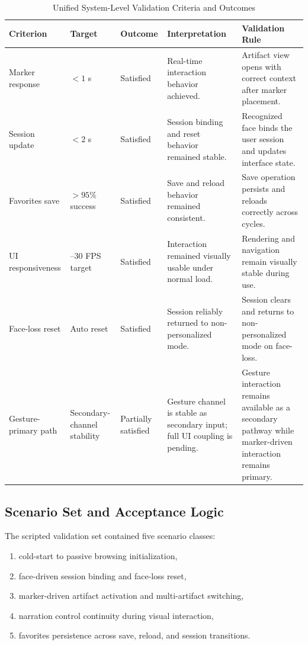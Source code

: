 \documentclass[conference]{IEEEtran}
\begin{document}
\begin{table}[t]
\caption{Unified System-Level Validation Criteria and Outcomes}
\label{tab:validation}
\centering
\footnotesize
\setlength{\tabcolsep}{4pt}
\begin{tabular}{@{}>{\raggedright\arraybackslash}p{2.4cm}>{\raggedright\arraybackslash}p{1.7cm}>{\raggedright\arraybackslash}p{1.9cm}>{\raggedright\arraybackslash}p{3.2cm}>{\raggedright\arraybackslash}p{7.0cm}@{}}
\toprule
Criterion & Target & Outcome & Interpretation & Validation Rule \\
\midrule
Marker response & $<1$ s & Satisfied & Real-time interaction behavior achieved. & Artifact view opens with correct context after marker placement. \\
Session update & $<2$ s & Satisfied & Session binding and reset behavior remained stable. & Recognized face binds the user session and updates interface state. \\
Favorites save & $>95\%$ success & Satisfied & Save and reload behavior remained consistent. & Save operation persists and reloads correctly across cycles. \\
UI responsiveness & 25--30 FPS target & Satisfied & Interaction remained visually usable under normal load. & Rendering and navigation remain visually stable during use. \\
Face-loss reset & Auto reset & Satisfied & Session reliably returned to non-personalized mode. & Session clears and returns to non-personalized mode on face-loss. \\
Gesture-primary path & Secondary-channel stability & Partially satisfied & Gesture channel is stable as secondary input; full UI coupling is pending. & Gesture interaction remains available as a secondary pathway while marker-driven interaction remains primary. \\
\bottomrule
\end{tabular}
\end{table}

\subsection{Scenario Set and Acceptance Logic}
The scripted validation set contained five scenario classes:
\begin{enumerate}[leftmargin=*]
    \item cold-start to passive browsing initialization,
    \item face-driven session binding and face-loss reset,
    \item marker-driven artifact activation and multi-artifact switching,
    \item narration control continuity during visual interaction,
    \item favorites persistence across save, reload, and session transitions.
\end{enumerate}
\end{document}
